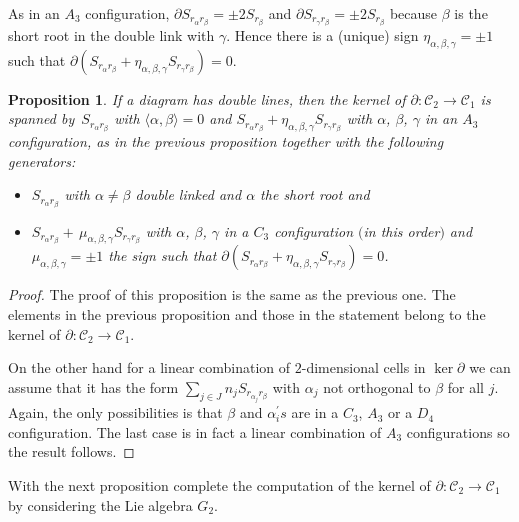 \documentclass[10pt,a4paper]{amsart}
\numberwithin{equation}{section}
\newtheorem{Proposition}[Theorem]{Proposition}
 { \theoremstyle{definition}
\newtheorem{Definition}[Theorem]{Definition}
\newtheorem{Note}[Theorem]{Note}
\newtheorem{Example}[Theorem]{Example}
\newtheorem{Remark}[Theorem]{Remark} }
\begin{document}
As in an $A_{3}$ configuration, $\partial S_{r_{\alpha }r_{\beta }}=\pm 2S_{r_{\beta }}$ and $\partial S_{r_{\gamma }r_{\beta }}=\pm 2S_{r_{\beta }}$ because $\beta $ is the short root in the double link with $\gamma $. Hence there is a (unique) sign $\eta_{\alpha,\beta,\gamma }=\pm 1$ such that $\partial (S_{r_{\alpha }r_{\beta }}+\eta _{\alpha,\beta,\gamma}S_{r_{\gamma }r_{\beta }})=0$.

\begin{Proposition}\label{pro.double}If a diagram has double lines, then the kernel of $\partial \colon \mathcal{C}_{2}\longrightarrow \mathcal{C}_{1}$ is spanned by~$S_{r_{\alpha }r_{\beta }}$ with $\langle \alpha,\beta \rangle =0$ and $S_{r_{\alpha }r_{\beta }}+\eta _{\alpha,\beta,\gamma }S_{r_{\gamma }r_{\beta }}$ with $\alpha$, $\beta$, $\gamma $ in an $A_{3}$ configuration, as in the previous proposition together with the following generators:
\begin{itemize}\itemsep=0pt
\item $S_{r_{\alpha }r_{\beta }}$ with $\alpha \neq \beta $ double linked and $\alpha $ the short root and
\item $S_{r_{\alpha }r_{\beta }}+\,\mu _{\alpha,\beta,\gamma }S_{r_{\gamma}r_{\beta }}$ with $\alpha$, $\beta$, $\gamma $ in a $C_{3}$ configuration $($in this order$)$ and $\mu _{\alpha,\beta,\gamma }=\pm 1$ the sign such that $\partial ( S_{r_{\alpha }r_{\beta }}+\eta _{\alpha,\beta,\gamma}S_{r_{\gamma }r_{\beta }} ) =0$.
\end{itemize}
\end{Proposition}

\begin{proof} The proof of this proposition is the same as the previous one. The elements in the previous proposition and those in the statement belong to the kernel of $\partial \colon \mathcal{C}_{2}\longrightarrow \mathcal{C}_{1}$.

On the other hand for a linear combination of $2$-dimensional cells in $\ker \partial $ we can assume that it has the form $\sum\limits_{j\in J}n_{j}S_{r_{\alpha _{j}}r_{\beta }}$ with $\alpha _{j}$ not orthogonal to $\beta $ for all $j$. Again, the only possibilities is that $\beta $ and $\alpha _{i}^{\prime }s$ are in a $C_{3}$, $A_{3}$ or a $D_{4}$ configuration. The last case is in fact a linear combination of $A_{3}$ configurations so the result follows.
\end{proof}

With the next proposition complete the computation of the kernel of $\partial \colon \mathcal{C}_{2}\longrightarrow \mathcal{C}_{1}$ by considering the Lie algebra $G_{2}$.
\end{document}
